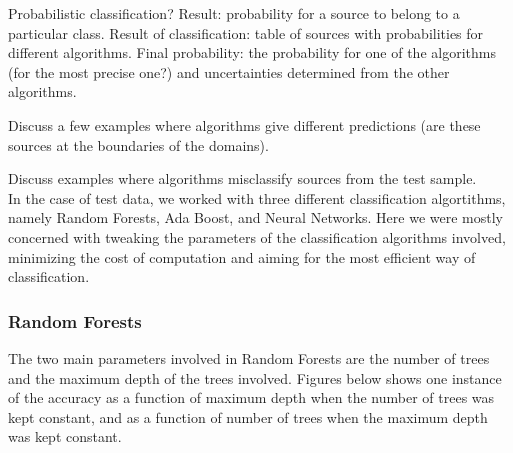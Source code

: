 Probabilistic classification? Result: probability for a source to belong to a particular class.
Result of classification: table of sources with probabilities for different algorithms.
Final probability: the probability for one of the algorithms (for the most precise one?) and uncertainties determined from the other algorithms.

Discuss a few examples where algorithms give different predictions (are these sources at the boundaries of the domains).

Discuss examples where algorithms misclassify sources from the test sample.\\


In the case of test data, we worked with three different classification algortithms, namely Random Forests, Ada Boost, and Neural Networks. Here we were mostly concerned with tweaking the parameters of the classification algorithms involved, minimizing the cost of computation and aiming for the most efficient way of classification. \\

\subsubsection{Random Forests}

The two main parameters involved in Random Forests are the number of trees and the maximum depth of the trees involved. Figures below shows one instance of the accuracy as a function of maximum depth when the number of trees was kept constant, and as a function of number of trees when the maximum depth was kept constant. \\

